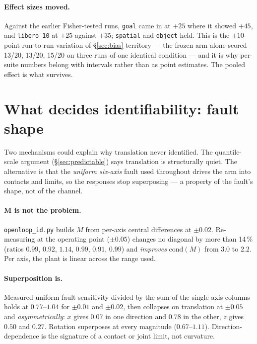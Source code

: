\documentclass[11pt,a4paper]{article}
\newcommand{\code}[1]{\texttt{\small #1}}
\begin{document}
\paragraph{Effect sizes moved.}
Against the earlier Fisher-tested runs, \code{goal} came in at $+25$ where it showed $+45$,
and \code{libero\_10} at $+25$ against $+35$; \code{spatial} and \code{object} held. This is
the $\pm 10$-point run-to-run variation of \S\ref{sec:bias} territory --- the frozen arm
alone scored 13/20, 13/20, 15/20 on three runs of one identical condition --- and it is why
per-suite numbers belong with intervals rather than as point estimates. The pooled effect is
what survives.

\section{What decides identifiability: fault shape}
\label{sec:shape}

Two mechanisms could explain why translation never identified. The quantile-scale
argument (\S\ref{sec:predictable}) says translation is structurally quiet. The
alternative is that the \emph{uniform six-axis} fault used throughout drives the arm
into contacts and limits, so the responses stop superposing --- a property of the
fault's shape, not of the channel.

\paragraph{M is not the problem.}
\code{openloop\_id.py} builds $M$ from per-axis central differences at $\pm 0.02$.
Re-measuring at the operating point ($\pm 0.05$) changes no diagonal by more than
14\,\% (ratios $0.99$, $0.92$, $1.14$, $0.99$, $0.91$, $0.99$) and \emph{improves}
$\mathrm{cond}(M)$ from $3.0$ to $2.2$. Per axis, the plant is linear across the
range used.

\paragraph{Superposition is.}
Measured uniform-fault sensitivity divided by the sum of the single-axis columns
holds at $0.77$--$1.04$ for $\pm 0.01$ and $\pm 0.02$, then collapses on
translation at $\pm 0.05$ and \emph{asymmetrically}: $x$ gives $0.07$ in one
direction and $0.78$ in the other, $z$ gives $0.50$ and $0.27$. Rotation superposes
at every magnitude ($0.67$--$1.11$). Direction-dependence is the signature of a
contact or joint limit, not curvature.
\end{document}
